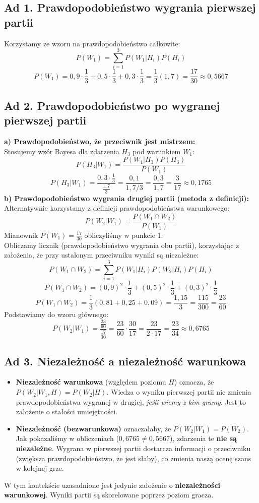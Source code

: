 \documentclass[polish, 10pt]{extarticle}
\begin{document}
\subsection*{Ad 1. Prawdopodobieństwo wygrania pierwszej partii}
Korzystamy ze wzoru na prawdopodobieństwo całkowite:
\[ P(W_1) = \sum_{i=1}^{3} P(W_1 | H_i) P(H_i) \]
\[ P(W_1) = 0,9 \cdot \frac{1}{3} + 0,5 \cdot \frac{1}{3} + 0,3 \cdot \frac{1}{3} = \frac{1}{3}(1,7) = \frac{17}{30} \approx 0,5667 \]

\subsection*{Ad 2. Prawdopodobieństwo po wygranej pierwszej partii}
\textbf{a) Prawdopodobieństwo, że przeciwnik jest mistrzem:} \\
Stosujemy wzór Bayesa dla zdarzenia $H_3$ pod warunkiem $W_1$:
\[ P(H_3 | W_1) = \frac{P(W_1 | H_3) P(H_3)}{P(W_1)} \]
\[ P(H_3 | W_1) = \frac{0,3 \cdot \frac{1}{3}}{\frac{1,7}{3}} = \frac{0,1}{1,7/3} = \frac{0,3}{1,7} = \frac{3}{17} \approx 0,1765 \]
\textbf{b) Prawdopodobieństwo wygrania drugiej partii (metoda z definicji):} \\
Alternatywnie korzystamy z definicji prawdopodobieństwa warunkowego:
\[ P(W_2 | W_1) = \frac{P(W_1 \cap W_2)}{P(W_1)} \]
Mianownik $P(W_1) = \frac{17}{30}$ obliczyliśmy w punkcie 1. \\
Obliczamy licznik (prawdopodobieństwo wygrania obu partii), korzystając z założenia, że przy ustalonym przeciwniku wyniki są niezależne:
\[ P(W_1 \cap W_2) = \sum_{i=1}^{3} P(W_1 | H_i) P(W_2 | H_i) P(H_i) \]
\[ P(W_1 \cap W_2) = (0,9)^2 \cdot \frac{1}{3} + (0,5)^2 \cdot \frac{1}{3} + (0,3)^2 \cdot \frac{1}{3} \]
\[ P(W_1 \cap W_2) = \frac{1}{3} (0,81 + 0,25 + 0,09) = \frac{1,15}{3} = \frac{115}{300} = \frac{23}{60} \]
Podstawiamy do wzoru głównego:
\[ P(W_2 | W_1) = \frac{\frac{23}{60}}{\frac{17}{30}} = \frac{23}{60} \cdot \frac{30}{17} = \frac{23}{2 \cdot 17} = \frac{23}{34} \approx 0,6765 \]

\subsection*{Ad 3. Niezależność a niezależność warunkowa}
\begin{itemize}
    \item \textbf{Niezależność warunkowa} (względem poziomu $H$) oznacza, że $P(W_2 | W_1, H) = P(W_2 | H)$. Wiedza o wyniku pierwszej partii nie zmienia prawdopodobieństwa wygranej w drugiej, \textit{jeśli wiemy z kim gramy}. Jest to założenie o stałości umiejętności.
    \item \textbf{Niezależność (bezwarunkowa)} oznaczałaby, że $P(W_2 | W_1) = P(W_2)$. Jak pokazaliśmy w obliczeniach ($0,6765 \neq 0,5667$), zdarzenia te \textbf{nie są niezależne}. Wygrana w pierwszej partii dostarcza informacji o przeciwniku (zwiększa prawdopodobieństwo, że jest słaby), co zmienia naszą ocenę szans w kolejnej grze.
\end{itemize}
W tym kontekście uzasadnione jest jedynie założenie o \textbf{niezależności warunkowej}. Wyniki partii są skorelowane poprzez poziom gracza.
\end{document}
